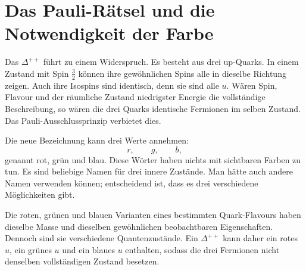 \begin{classroomqa}
\end{classroomqa}

\section{Das Pauli-Rätsel und die Notwendigkeit der Farbe}

Das \(\Delta^{++}\) führt zu einem Widerspruch. Es besteht aus drei up-Quarks. In einem Zustand mit Spin \(\tfrac32\) können ihre gewöhnlichen Spins alle in dieselbe Richtung zeigen. Auch ihre Isospins sind identisch, denn sie sind alle \(u\). Wären Spin, Flavour und der räumliche Zustand niedrigster Energie die vollständige Beschreibung, so wären die drei Quarks identische Fermionen im selben Zustand. Das Pauli-Ausschlussprinzip verbietet dies.

\begin{classroomqa}
\end{classroomqa}

Die neue Bezeichnung kann drei Werte annehmen:
\begin{equation}
r,\qquad g,\qquad b,
\end{equation}
genannt rot, grün und blau. Diese Wörter haben nichts mit sichtbaren Farben zu tun. Es sind beliebige Namen für drei innere Zustände. Man hätte auch andere Namen verwenden können; entscheidend ist, dass es drei verschiedene Möglichkeiten gibt.

Die roten, grünen und blauen Varianten eines bestimmten Quark-Flavours haben dieselbe Masse und dieselben gewöhnlichen beobachtbaren Eigenschaften. Dennoch sind sie verschiedene Quantenzustände. Ein \(\Delta^{++}\) kann daher ein rotes \(u\), ein grünes \(u\) und ein blaues \(u\) enthalten, sodass die drei Fermionen nicht denselben vollständigen Zustand besetzen.

